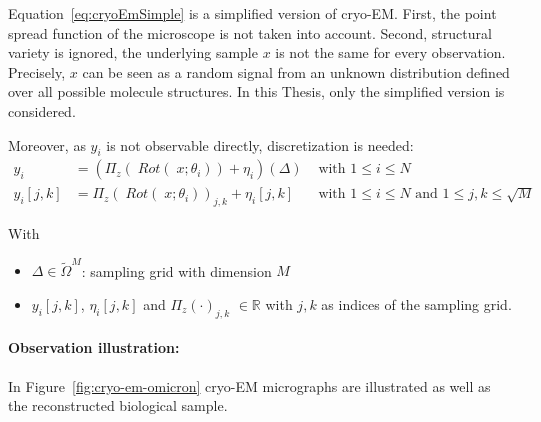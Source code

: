 Equation~\ref{eq:cryoEmSimple} is a simplified version of cryo-EM.
First, the point spread function of the microscope is not taken into account.
Second, structural variety is ignored, the underlying sample $x$ is not the same 
for every observation. 
Precisely, $x$ can be seen as a random signal from an unknown distribution defined over all possible molecule structures.
In this Thesis, only the simplified version is considered.

Moreover, as $y_i$ is not observable directly, discretization is needed:
\begin{equation}
    \label{eq:cryoEmSimpleDiscrete}
    \begin{aligned}
        y_i &= \left( \Pi_z (\; Rot (\;x; \theta_i)) + \eta_i\right)(\Delta) & \text{ with } 1 \leq i \leq N \\
        y_i[j,k] &= \Pi_z (\; Rot(\;x; \theta_i))_{j,k} + \eta_i[j,k] & \text{ with } 1 \leq i \leq N \text{ and } 1 \leq j,k \leq \sqrt{M}
    \end{aligned}
\end{equation}

With
\begin{itemize}
    \item $\Delta \in \tilde{\Omega}^{M}$: sampling grid with dimension $M$
    \item $y_i[j,k]$, $\eta_i[j,k]$ and $\Pi_z(\cdot)_{j,k}$ $ \in \mathbb{R}$ with $j,k$ as indices of the sampling grid.
\end{itemize}


\paragraph{Observation illustration:}
In Figure~\ref{fig:cryo-em-omicron} cryo-EM micrographs are illustrated as well as the reconstructed biological sample.

